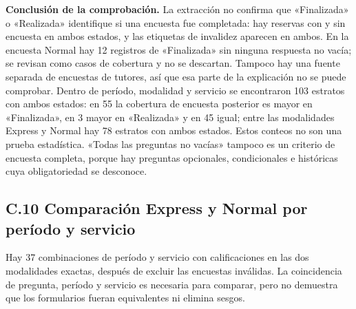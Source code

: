 \documentclass[11pt,letterpaper]{article}
\begin{document}
\textbf{Conclusión de la comprobación.} La extracción no confirma que «Finalizada» o «Realizada» identifique si una encuesta fue completada: hay reservas con y sin encuesta en ambos estados, y las etiquetas de invalidez aparecen en ambos. En la encuesta Normal hay 12 registros de «Finalizada» sin ninguna respuesta no vacía; se revisan como casos de cobertura y no se descartan. Tampoco hay una fuente separada de encuestas de tutores, así que esa parte de la explicación no se puede comprobar. Dentro de período, modalidad y servicio se encontraron 103 estratos con ambos estados: en 55 la cobertura de encuesta posterior es mayor en «Finalizada», en 3 mayor en «Realizada» y en 45 igual; entre las modalidades Express y Normal hay 78 estratos con ambos estados. Estos conteos no son una prueba estadística. «Todas las preguntas no vacías» tampoco es un criterio de encuesta completa, porque hay preguntas opcionales, condicionales e históricas cuya obligatoriedad se desconoce.

\subsection*{C.10 Comparación Express y Normal por período y servicio}

Hay 37 combinaciones de período y servicio con calificaciones en las dos modalidades exactas, después de excluir las encuestas inválidas. La coincidencia de pregunta, período y servicio es necesaria para comparar, pero no demuestra que los formularios fueran equivalentes ni elimina sesgos.
\end{document}
